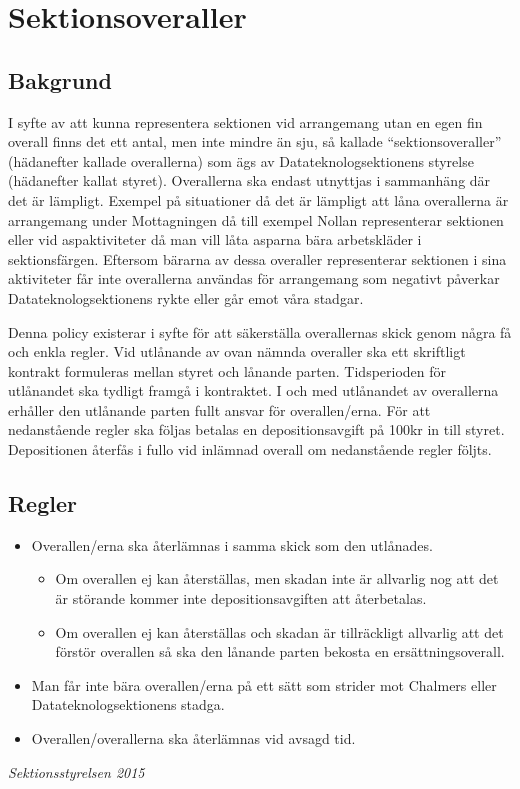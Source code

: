 \section{Sektionsoveraller}

\subsection{Bakgrund}
I syfte av att kunna representera sektionen vid arrangemang utan en egen fin overall finns det ett antal, men inte mindre än sju, så kallade ``sektionsoveraller'' (hädanefter kallade overallerna) som ägs av Datateknologsektionens styrelse (hädanefter kallat styret). Overallerna ska endast utnyttjas i sammanhäng där det är lämpligt.
Exempel på situationer då det är lämpligt att låna overallerna är arrangemang under Mottagningen då till exempel Nollan representerar sektionen eller vid aspaktiviteter då man vill låta asparna bära arbetskläder i sektionsfärgen.
Eftersom bärarna av dessa overaller representerar sektionen i sina aktiviteter får inte overallerna användas för arrangemang som negativt påverkar Datateknologsektionens rykte eller går emot våra stadgar.

Denna policy existerar i syfte för att säkerställa overallernas skick genom några få och enkla regler.
Vid utlånande av ovan nämnda overaller ska ett skriftligt kontrakt formuleras mellan styret och lånande parten. Tidsperioden för utlånandet ska tydligt framgå i kontraktet. I och med utlånandet av overallerna erhåller den utlånande parten fullt ansvar för overallen/erna. För att nedanstående regler ska följas betalas en depositionsavgift på 100kr in till styret. Depositionen återfås i fullo vid inlämnad overall om nedanstående regler följts.

\subsection{Regler}
\begin{itemize}
\item Overallen/erna ska återlämnas i samma skick som den utlånades.
  \begin{itemize}
  \item Om overallen ej kan återställas, men skadan inte är allvarlig nog att det är störande kommer inte depositionsavgiften att återbetalas.
  \item Om overallen ej kan återställas och skadan är tillräckligt allvarlig att det förstör overallen så ska den lånande parten bekosta en ersättningsoverall.
  \end{itemize}
\item Man får inte bära overallen/erna på ett sätt som strider mot Chalmers eller Datateknologsektionens stadga.
\item Overallen/overallerna ska återlämnas vid avsagd tid.
\end{itemize}

\vspace{1cm}

\emph{Sektionsstyrelsen 2015}
